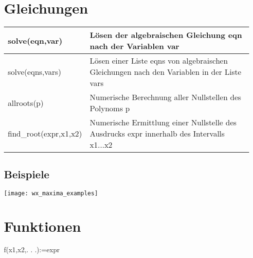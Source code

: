 \documentclass[../main.tex]{subfiles}
\begin{document}
\section{Gleichungen}
\begin{tabularx}{0.8\textwidth} { 
    >{\centering\arraybackslash}X 
    >{\centering\arraybackslash}X  }
    solve(eqn,var) & Lösen der algebraischen Gleichung eqn nach der Variablen var
    \\ [7pt]
    \hline
    solve(eqns,vars) & Lösen einer Liste eqns von algebraischen Gleichungen nach den Variablen in der Liste vars
    \\ [7pt]
    \hline
    allroots(p) & Numerische Berechnung aller Nullstellen des Polynoms p
    \\ [7pt]
    \hline
    find\_root(expr,x1,x2) & Numerische Ermittlung einer Nullstelle des Ausdrucks expr innerhalb des Intervalls x1...x2
    \\ [7pt]
    \hline
\end{tabularx}

\subsection{Beispiele}
\texttt{[image: wx\_maxima\_examples]}

\section{Funktionen}
f(x1,x2,. . .):=expr

\iffalse
\begin{tabularx}{0.8\textwidth} { 
    >{\centering\arraybackslash}X 
    >{\centering\arraybackslash}X  }
    &
    \\ [7pt]
    \hline
    &
    \\ [7pt]
    \hline
    &
    \\ [7pt]
    \hline
    &
    \\ [7pt]
    \hline
    &
    \\ [7pt]
    \hline
\end{tabularx}
\fi
\end{document}
